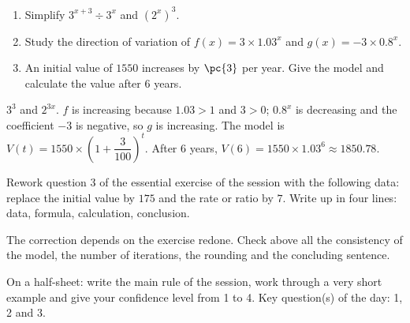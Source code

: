 \begin{exercise}[essential]
\begin{enumerate}\item Simplify $3^{x+3}\div3^x$ and $(2^x)^3$.\item Study the direction of variation of $f(x)=3\times\num{1,03}^x$ and $g(x)=-3\times\num{0,8}^x$.\item An initial value of $1550$ increases by $\pc{3}$ per year. Give the model and calculate the value after $6$ years.\end{enumerate}
\end{exercise}
\begin{solution}$3^3$ and $2^{3x}$. $f$ is increasing because $\num{1,03}>1$ and $3>0$; $\num{0,8}^x$ is decreasing and the coefficient $-3$ is negative, so $g$ is increasing. The model is $V(t)=1550\times\left(1+\dfrac{3}{100}\right)^t$. After $6$ years, $V(6)=1550\times\num{1,03}^6\approx\num{1850,78}$.\end{solution}


\begin{homework}Rework question 3 of the essential exercise of the session with the following data: replace the initial value by $175$ and the rate or ratio by $7$. Write up in four lines: data, formula, calculation, conclusion.\end{homework}
\begin{solution}The correction depends on the exercise redone. Check above all the consistency of the model, the number of iterations, the rounding and the concluding sentence.\end{solution}

\begin{exitticket}[3 minutes]On a half-sheet: write the main rule of the session, work through a very short example and give your confidence level from 1 to 4. Key question(s) of the day: 1, 2 and 3.\end{exitticket}

